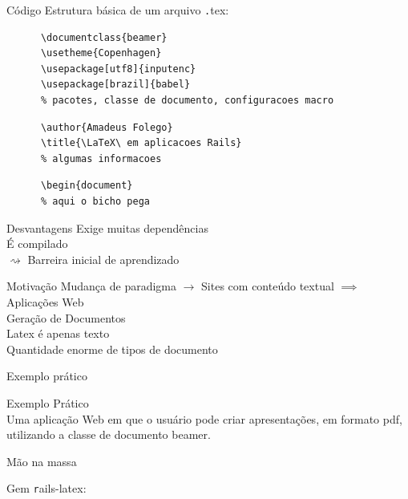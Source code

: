 \documentclass{beamer}
\begin{document}
  \begin{frame}[fragile]{Código}
    Estrutura básica de um arquivo {\texttt .tex}:
    \begin{verbatim}
      \documentclass{beamer}
      \usetheme{Copenhagen}
      \usepackage[utf8]{inputenc}
      \usepackage[brazil]{babel}
      % pacotes, classe de documento, configuracoes macro
    \end{verbatim}
    \pause\begin{verbatim}
      \author{Amadeus Folego}
      \title{\LaTeX\ em aplicacoes Rails}
      % algumas informacoes
    \end{verbatim}
    \pause\begin{verbatim}
      \begin{document}
      % aqui o bicho pega
    \end{verbatim}
\end{frame}
  \begin{frame}{Desvantagens}
     Exige muitas dependências\\\pause
    \onslide<2->{ $ \rightsquigarrow $ } É compilado\\\pause
     Barreira inicial de aprendizado
  \end{frame}
  \begin{frame}{Motivação}
     Mudança de paradigma $\rightarrow$ {\tiny Sites com conteúdo textual $ \implies $ Aplicações Web}\\\pause
    \onslide<2>{$ \nabla $} Geração de Documentos\\\pause
     Latex é apenas texto\\\pause
     Quantidade enorme de tipos de documento\\
  \end{frame}
  \begin{frame}{Exemplo prático}
    \begin{center}
      {\Huge Exemplo Prático}\\[1em]
      Uma aplicação Web em que o usuário pode criar apresentações, em formato pdf, utilizando a classe de documento beamer.
    \end{center}
  \end{frame}
  \begin{frame}{Mão na massa}
    \begin{center}
      \Large Gem {\texttt rails-latex}: \href{https://github.com/jacott/rails-latex}{}
    \end{center}
  \end{frame}
\end{document}
